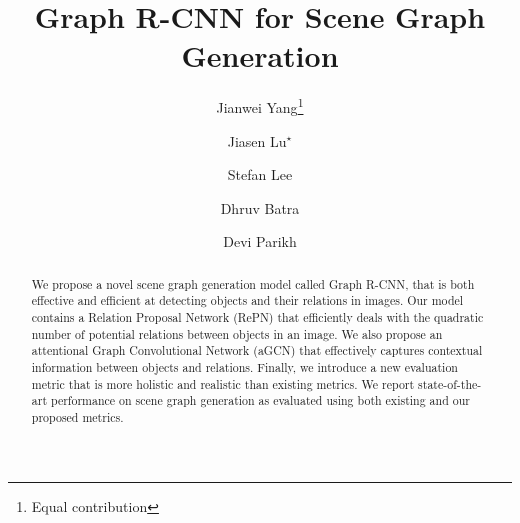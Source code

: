 \documentclass[runningheads]{llncs}
\newcommand{\etal}{\textit{et al}.}
\begin{document}
%
\title{Graph R-CNN for Scene Graph Generation} 

%
\author{Jianwei Yang\thanks{Equal contribution} \and
Jiasen Lu$^{\star}$ \and
Stefan Lee \and
Dhruv Batra \and
Devi Parikh
}
%
\authorrunning{Yang and Lu \etal}
%

%
\maketitle              %
%
\begin{abstract}
We propose a novel scene graph generation model called Graph R-CNN, that is both effective and efficient at detecting objects and their relations in images. Our model contains a Relation Proposal Network (RePN) that efficiently deals with the quadratic number of potential relations between objects in an image. We also propose an attentional Graph Convolutional Network (aGCN) that effectively captures contextual information between objects and relations. Finally, we introduce a new evaluation metric that is more holistic and realistic than existing metrics. We report state-of-the-art performance on scene graph generation as evaluated using both existing and our proposed metrics.

\end{abstract}
%
%
%








%
%
%


\end{document}
